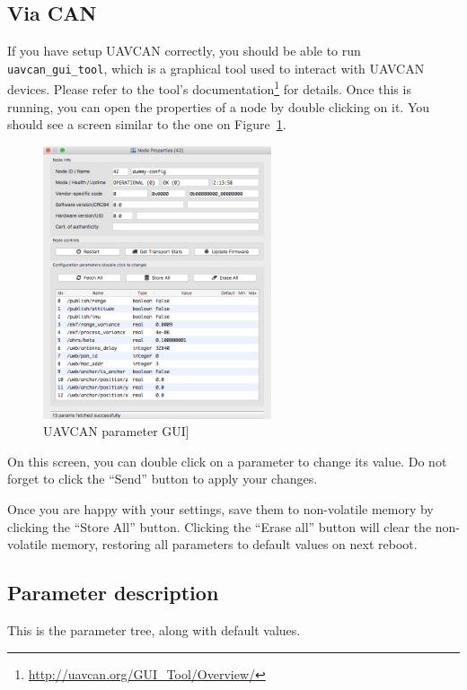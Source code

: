 \subsection{Via CAN}\label{via-can}

If you have setup UAVCAN correctly, you should be able to run
\texttt{uavcan\_gui\_tool}, which is a graphical tool used to interact
with UAVCAN devices. Please refer to
the tool's documentation\footnote{\url{http://uavcan.org/GUI_Tool/Overview/}}
for details. Once this is running, you can open the properties of a node
by double clicking on it. You should see a screen similar to the one on Figure~\ref{fig:gui-param}.

\begin{figure}
\centering
\includegraphics[width=0.60000\textwidth]{figures/uavcan_gui.png}
\caption{UAVCAN parameter GUI\label{fig:gui-param}]}
\end{figure}

On this screen, you can double click on a parameter to change its value.
Do not forget to click the ``Send'' button to apply your changes.

Once you are happy with your settings, save them to non-volatile memory
by clicking the ``Store All'' button. Clicking the ``Erase all'' button
will clear the non-volatile memory, restoring all parameters to default
values on next reboot.

\subsection{Parameter description}\label{parameter-description}

This is the parameter tree, along with default values.

